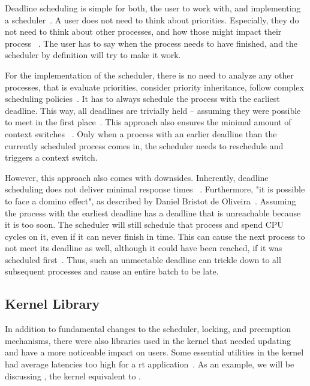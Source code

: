 \documentclass[10pt,twocolumn,a4paper]{article}
\begin{document}
Deadline scheduling is simple for both, the user to work with, and implementing a scheduler~\cite{bristot_de_oliveira_deadline_2018}.
A user does not need to think about priorities.
Especially, they do not need to think about other processes, and how those might impact their process ~\cite{bristot_de_oliveira_deadline_2018}.
The user has to say when the process needs to have finished, and the scheduler by definition will try to make it work.

For the implementation of the scheduler, there is no need to analyze any other processes, that is evaluate priorities, consider priority inheritance, follow complex scheduling policies~\cite{bristot_de_oliveira_deadline_2018}.
It has to always schedule the process with the earliest deadline.
This way, all deadlines are trivially held -- assuming they were possible to meet in the first place~\cite{bristot_de_oliveira_deadline_2018}.
This approach also ensures the minimal amount of context switches ~\cite{bristot_de_oliveira_deadline_2018}.
Only when a process with an earlier deadline than the currently scheduled process comes in, the scheduler needs to reschedule and triggers a context switch.

However, this approach also comes with downsides.
Inherently, deadline scheduling does not deliver minimal response times ~\cite{bristot_de_oliveira_deadline_2018}.
Furthermore, "it is possible to face a domino effect", as described by Daniel Bristot de Oliveira~\cite{bristot_de_oliveira_deadline_2018}.
Assuming the process with the earliest deadline has a deadline that is unreachable because it is too soon.
The scheduler will still schedule that process and spend CPU cycles on it, even if it can never finish in time.
This can cause the next process to not meet its deadline as well, although it could have been reached, if it was scheduled first~\cite{bristot_de_oliveira_deadline_2018}.
Thus, such an unmeetable deadline can trickle down to all subsequent processes and cause an entire batch to be late.


\subsection{Kernel Library}
\the\linewidth
In addition to fundamental changes to the scheduler, locking, and preemption mechanisms, there were also libraries used in the kernel that needed updating and have a more noticeable impact on users.
Some essential utilities in the kernel had average latencies too high for a \acrshort{rt} application~\cite{edge_discussion_2022}.
As an example, we will be discussing , the kernel equivalent to .
\end{document}
